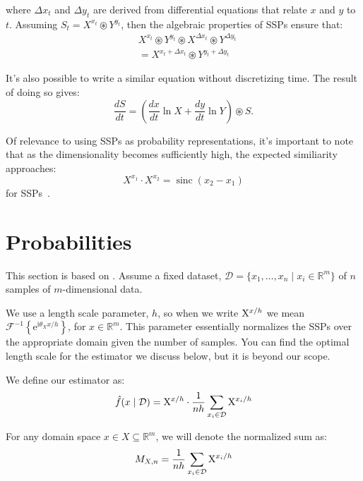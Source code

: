 \documentclass[10pt,letterpaper,oneside]{article}
\newcommand{\sinc}[1]{\operatorname{sinc}\left({#1}\right)}
\newcommand{\ssp}[1]{\mathrm{\uppercase{#1}}^{\lowercase{#1}/h}}
\newcommand{\sspi}[2]{\mathrm{\uppercase{#1}}^{\lowercase{#1}_{#2}/h}}
\begin{document}
where $\Delta x_t$ and $\Delta y_t$ are derived from differential equations that relate $x$ and $y$ to $t$. Assuming $ S_{t}=X^{x_t} \circledast Y^{y_t}$, then the algebraic properties of SSPs ensure that: 
\begin{align}
  & X^{x_t} \circledast Y^{y_t} \circledast X^{\Delta x_t} \circledast Y^{\Delta y_t} \\
  &= X^{x_t + \Delta x_t} \circledast Y^{y_t + \Delta y_t} 
\end{align}

It's also possible to write a similar equation without discretizing time. The result of doing so gives: 
\begin{equation} \label{eq:continuous-binding}
  \frac{d S }{dt} = \left( \frac{dx}{dt} \ln X + \frac{dy}{dt} \ln Y \right) \circledast S \text{.}
 \end{equation}

Of relevance to using SSPs as probability representations, it's important to note that as the dimensionality becomes sufficiently high, the expected similiarity approaches:
\begin{equation}
X^{x_1} \cdot X^{x_2} = \sinc{x_2 - x_1}
\end{equation}
for SSPs~\cite{voelker2020short}.




\section{Probabilities}

This section is based on \cite{furlong2022fractional}. Assume a fixed dataset, $\mathcal{D} = \{x_{1},\ldots,x_{n}\mid x_{i} \in \mathbb{R}^{m}\}$ of $n$ samples of $m$-dimensional data. 

We use a length scale parameter, $h$, so when we write $\ssp{x}$ we mean $\mathcal{F}^{-1}\left\{\mathrm{e}^{\mathrm{i}\theta_{X}x/h}\right\}$, for $x \in \mathbb{R}^{m}$. This parameter essentially normalizes the SSPs over the appropriate domain given the number of samples. You can find the optimal length scale for the estimator we discuss below, but it is beyond our scope.

We define our estimator as: 
\begin{align}
  \hat{f}(x\mid \mathcal{D}) = \ssp{x}\cdot \frac{1}{nh}\sum_{x_{i} \in \mathcal{D}} \sspi{x}{i}
\end{align} 

For any domain space $x \in X \subseteq \mathbb{R}^{m}$, we will denote the normalized sum as:
\begin{align}
M_{X,n} = \frac{1}{nh}\sum_{x_{i} \in \mathcal{D}}\sspi{x}{i}
\end{align}
\end{document}
